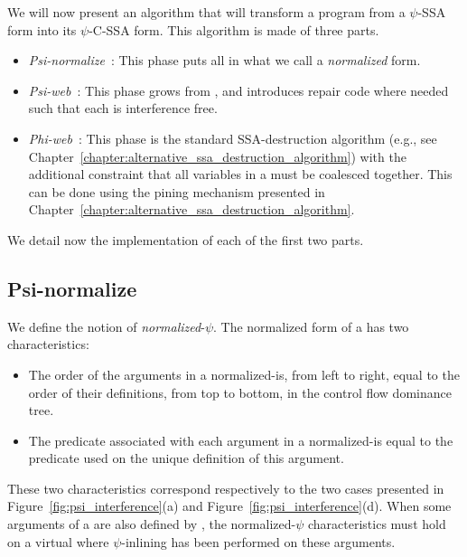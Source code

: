 We will now present an algorithm that will transform a program from a
$\psi$-SSA form into its $\psi$-C-SSA form. This algorithm is made of
three parts.

\begin{itemize}
\item \emph{Psi-normalize}~: This phase puts all \psifuns {}
in what we call a {\em normalized} form.
\item \emph{Psi-web}~: \index{\psiweb}This phase grows \psiwebs from \psifuns, and introduces repair code where needed such that each \psiweb is interference free.
\item \emph{Phi-web}~: This phase is the standard SSA-destruction algorithm (e.g., see Chapter~\ref{chapter:alternative_ssa_destruction_algorithm}) with the additional constraint that all variables in a \psiweb must be coalesced together. This can be done using the pining mechanism presented in Chapter~\ref{chapter:alternative_ssa_destruction_algorithm}. 
\end{itemize}

We detail now the implementation of each of the first two parts.

\subsection{Psi-normalize}

We define the notion of {\em normalized}-$\psi$. The normalized form of a \psifun has two characteristics:

\begin{itemize}
\item The order of the arguments in a normalized-\psifun is,
from left to right, equal to the order of their definitions, from top
to bottom, in the control flow dominance tree.
\item The predicate associated with each argument in a
normalized-\psifun is equal to the predicate used on the
unique definition of this argument.
\end{itemize}

These two characteristics correspond respectively to the two cases
presented in Figure~\ref{fig:psi_interference}(a) and
Figure~\ref{fig:psi_interference}(d).
When some arguments of a \psifun are also defined by \psifuns, the {normalized}-$\psi$ characteristics must hold on a
virtual \psifun where $\psi$-inlining has been performed on
these arguments.

